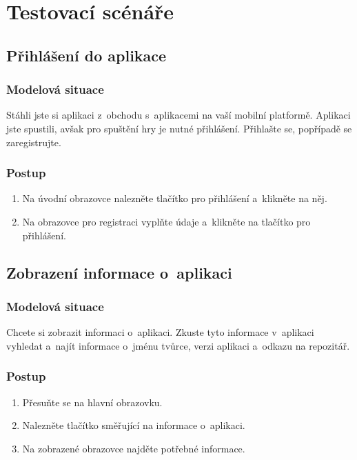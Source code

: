 \chapter{Testovací scénáře}
\label{chap:test-scenarios}

\section{Přihlášení do aplikace}
\label{scen:login}

\subsection*{Modelová situace}

Stáhli jste si aplikaci z~obchodu s~aplikacemi na vaší mobilní platformě.
Aplikaci jste spustili,
avšak pro spuštění hry je nutné přihlášení.
Přihlašte se, popřípadě se zaregistrujte.

\subsection*{Postup}

\begin{enumerate}
    \item Na úvodní obrazovce nalezněte tlačítko pro přihlášení
    a~klikněte na něj.
    \item Na obrazovce pro registraci vyplňte údaje
    a~klikněte na tlačítko pro přihlášení.
\end{enumerate}

\section{Zobrazení informace o~aplikaci}
\label{scen:about}

\subsection*{Modelová situace}

Chcete si zobrazit informaci o~aplikaci.
Zkuste tyto informace v~aplikaci vyhledat a~najít informace
o~jménu tvůrce, verzi aplikaci a~odkazu na repozitář.

\subsection*{Postup}

\begin{enumerate}
    \item Přesuňte se na hlavní obrazovku.
    \item Nalezněte tlačítko směřující na informace o~aplikaci.
    \item Na zobrazené obrazovce najděte potřebné informace.
\end{enumerate}

